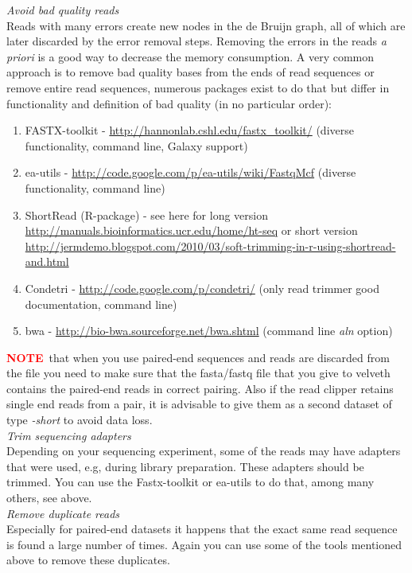 \documentclass[12pt]{article}
\newcommand{\NOTE}{\textcolor{red}{\textbf{NOTE}}}
\begin{document}
\emph{Avoid bad quality reads} \\

Reads with many errors create new nodes in the de Bruijn graph, all of which are later discarded by the error removal steps. Removing the errors in the reads \emph{a priori} is a good way to decrease the memory consumption.  A very common approach is to remove bad quality bases from the ends of read sequences or remove entire read sequences, numerous packages exist to do that but differ in functionality and definition of bad quality  (in no particular order):
\begin{enumerate}
\item  FASTX-toolkit - \url{http://hannonlab.cshl.edu/fastx_toolkit/}  (diverse functionality, command line, Galaxy support)
\item ea-utils - \url{http://code.google.com/p/ea-utils/wiki/FastqMcf} (diverse functionality, command line)
\item ShortRead (R-package) -  see here for long version \url{http://manuals.bioinformatics.ucr.edu/home/ht-seq} or short version \url{http://jermdemo.blogspot.com/2010/03/soft-trimming-in-r-using-shortread-and.html}
\item Condetri - \url{http://code.google.com/p/condetri/} (only read trimmer good documentation, command line)
\item bwa - \url{http://bio-bwa.sourceforge.net/bwa.shtml} (command line \emph{aln} option)
\end{enumerate}

\NOTE \  that when you use paired-end sequences and reads are discarded from the file you need to make sure that the fasta/fastq file that you give to velveth contains the paired-end reads in correct pairing. Also if the read clipper retains single end reads from a pair, it is advisable to give them as a second dataset of type \emph{-short} to avoid data loss.\\

\emph{Trim sequencing adapters} \\

Depending on your sequencing experiment, some of the reads may have adapters that were used, e.g, during library preparation. These adapters should be trimmed. You can use the Fastx-toolkit or ea-utils to do that, among many others, see above.\\

\emph{Remove duplicate reads} \\

Especially for paired-end datasets it happens that the exact same read sequence is found a large number of times. Again you can use some of the tools mentioned above to remove these duplicates.
\end{document}
